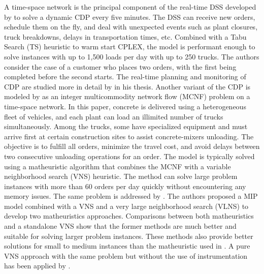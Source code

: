 \documentclass{article}
\begin{document}
{A time-space network is the principal component of the real-time DSS developed by \cite{durbin2008or} to solve a dynamic CDP every five minutes. The DSS can receive new orders, schedule them on the fly, and deal with unexpected events such as plant closures, truck breakdowns, delays in transportation times, etc. Combined with a Tabu Search (TS) heuristic to warm start CPLEX, the model is performant enough to solve instances with up to 1,500 loads per day with up to 250 trucks. The authors consider the case of a customer who places two orders, with the first being completed before the second starts. The real-time planning and monitoring of CDP are studied more in detail by \cite{garza2021dynamic} in his thesis. Another variant of the CDP is modeled by \cite{schmid2009hybrid} as an integer multicommodity network flow (MCNF) problem on a time-space network. In this paper, concrete is delivered using a heterogeneous fleet of vehicles, and each plant can load an illimited number of trucks simultaneously. Among the trucks, some have specialized equipment and must arrive first at certain construction sites to assist concrete-mixers unloading. The objective is to fulfill all orders, minimize the travel cost, and avoid delays between two consecutive unloading operations for an order. The model is typically solved using a matheuristic algorithm that combines the MCNF with a variable neighborhood search (VNS) heuristic. The method can solve large problem instances with more than 60 orders per day quickly without encountering any memory issues. The same problem is addressed by \cite{schmid2010hybridization}. The authors proposed a MIP model combined with a VNS and a very large neighborhood search (VLNS) to develop two matheuristics approaches. Comparisons between both matheuristics and a standalone VNS show that the former methods are much better and suitable for solving larger problem instances. These methods also provide better solutions for small to medium instances than the matheuristic used in \cite{schmid2009hybrid}. A pure VNS approach with the same problem but without the use of instrumentation has been applied by \cite{payr2009optimizing}.

}
\end{document}
